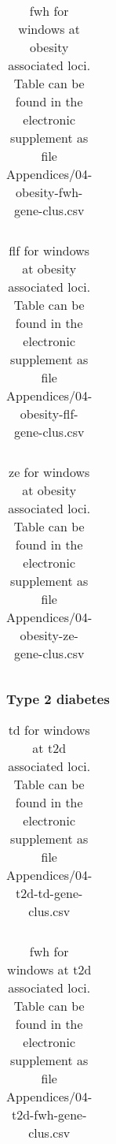 \documentclass[]{report}
\begin{document}
\begin{table}[!htb]
\caption{\gls{fwh} for windows at obesity associated loci. Table can be found in the electronic supplement as file Appendices/04-obesity-fwh-gene-clus.csv}
\centering
  \begin{tabular}{l l}
  \end{tabular}
  \label{tab:obesityfwhgeneclus}
\end{table}

\begin{table}[!htb]
\caption{\gls{flf} for windows at obesity associated loci. Table can be found in the electronic supplement as file Appendices/04-obesity-flf-gene-clus.csv}
\centering
  \begin{tabular}{l l}
  \end{tabular}
  \label{tab:obesityflfgeneclus}
\end{table}

\begin{table}[!htb]
\caption{\gls{ze} for windows at obesity associated loci. Table can be found in the electronic supplement as file Appendices/04-obesity-ze-gene-clus.csv}
\centering
  \begin{tabular}{l l}
  \end{tabular}
  \label{tab:obesityzegeneclus}
\end{table}

\FloatBarrier

\subsubsection{Type 2 diabetes}\label{type-2-diabetes}

\begin{table}[!htb]
\caption{\gls{td} for windows at \gls{t2d} associated loci. Table can be found in the electronic supplement as file Appendices/04-t2d-td-gene-clus.csv}
\centering
  \begin{tabular}{l l}
  \end{tabular}
  \label{tab:t2dtdgeneclus}
\end{table}

\begin{table}[!htb]
\caption{\gls{fwh} for windows at \gls{t2d} associated loci. Table can be found in the electronic supplement as file Appendices/04-t2d-fwh-gene-clus.csv}
\centering
  \begin{tabular}{l l}
  \end{tabular}
  \label{tab:t2dfwhgeneclus}
\end{table}
\end{document}
